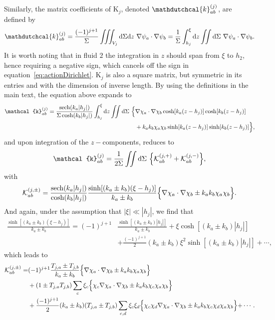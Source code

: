 \documentclass[a4paper]{jpconf}
\newcommand{\pow}[2]{#1^{(#2)}}
\newcommand{\dd}{\mathrm{d}}
\newcommand{\sech}{\mathrm{sech}}
\begin{document}
Similarly, the matrix coefficients of $\bm{\mathrm{K}}_j$, denoted $\pow{\mathdutchcal{k}}{j}_{ab}$, are defined by
\begin{equation}
\label{eq:app:kdefinition}
    \pow{\mathdutchcal{k}}{j}_{ab}=\frac{(-1)^{j+1}}{\Sigma}\iiint_{V_j} \dd\Sigma\dd z~ \nabla\psi_a\cdot\nabla\psi_b=\frac{1}{\Sigma}\int_{h_j}^{\xi}\dd z\iint \dd\Sigma~ \nabla\psi_a\cdot\nabla\psi_b.
\end{equation}
It is worth noting that in fluid $2$ the integration in $z$ should span from $\xi$ to $h_2$, hence requiring a negative sign, which cancels off the sign in equation~\eqref{eq:actionDirichlet}.
$\bm{\mathrm{K}}_j$ is also a square matrix, but symmetric in its entries and with the dimension of inverse length. By using the definitions in the main text, the equation above expands to
\begin{equation}
\begin{aligned}
    \pow{\mathcal{k}}{j}_{ab}=\frac{\sech(k_a|h_j|)}{\Sigma\cosh(k_b|h_j|)}\int_{h_j}^{\xi}\dd z\iint \dd\Sigma~ \Bigl\{&\nabla\chi_a\cdot\nabla\chi_b \cosh[k_a(z-h_j)]\cosh[k_b(z-h_j)]\\
    &+k_ak_b\chi_a\chi_b \sinh[k_a(z-h_j)]\sinh[k_b(z-h_j)]\Bigl\},
\end{aligned}
\end{equation}
and upon integration of the $z-$components, reduces to
\begin{equation}
    \pow{\mathcal{k}}{j}_{ab}=\frac{1}{2\Sigma}\iint \dd\Sigma~ \Bigl\{\pow{\mathcal{K}}{j,+}_{ab}+ \pow{\mathcal{K}}{j,-}_{ab}\Bigl\},
\end{equation}
with
\begin{equation}
    \pow{\mathcal{K}}{j,\pm}_{ab}= \frac{\sech(k_a|h_j|)}{\cosh(k_b|h_j|)}\frac{\sinh[(k_a\pm k_b)(\xi-h_j)]}{k_a\pm k_b}\Bigl\{\nabla\chi_a\cdot\nabla\chi_b\pm k_ak_b\chi_a\chi_b\Bigl\}.
\end{equation}
And again, under the assumption that $|\xi|\ll |h_j|$, we find that
\begin{equation}
    \begin{aligned}
    \frac{\sinh[(k_a\pm k_b)(\xi-h_j)]}{k_a\pm k_b} 
    = (-1)^{j+1}&\frac{\sinh[(k_a\pm k_b)|h_j|]}{k_a\pm k_b}
    +\xi \cosh [(k_a\pm k_b)|h_j|]\\
    &+\frac{(-1)^{j+1}}{2} (k_a\pm k_b)\xi ^2 \sinh[(k_a\pm k_b)|h_j|]+\cdots,
    \end{aligned}
\end{equation}
which leads to 
\begin{equation}
    \begin{aligned}
    \pow{\mathcal{K}}{j,\pm}_{ab}
    = &(-1)^{j+1}\frac{T_{j,a}\pm T_{j,b}}{k_a\pm k_b}\Bigl\{\nabla\chi_a\cdot\nabla\chi_b\pm k_ak_b\chi_a\chi_b\Bigl\}\\
    &+(1\pm T_{j,a} T_{j,b})\sum_c \xi_c \Bigl\{\chi_c\nabla\chi_a\cdot\nabla\chi_b\pm k_ak_b\chi_c\chi_a\chi_b\Bigl\} \\
    &+\frac{(-1)^{j+1}}{2} (k_a\pm k_b) (T_{j,a}\pm T_{j,b})\sum_{c,d} \xi_c\xi_d \Bigl\{\chi_c\chi_d\nabla\chi_a\cdot\nabla\chi_b\pm k_ak_b\chi_c\chi_d\chi_a\chi_b\Bigl\} +\cdots.
    \end{aligned}
\end{equation}
\end{document}
